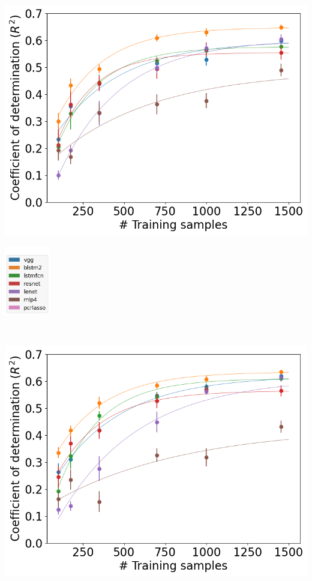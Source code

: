 \documentclass[a0paper,landscape,fontscale=0.365]{baposter}
\newenvironment{Figure}
  {\par\medskip\noindent\minipage{\linewidth}}
  {\endminipage\par\medskip}
\begin{document}
\begin{poster}
{\begin{multicols}{4}
    \begin{Figure}
        \centering
        \includegraphics[width=1.0\linewidth]{figures/curves_aug_20}
    \end{Figure}
    \columnbreak

    \begin{Figure}
        \includegraphics[height=3cm]{figures/legend}
    \end{Figure}

\end{multicols}
\\
\begin{multicols}{4}
    \begin{Figure}
        \centering
        \includegraphics[width=1.0\linewidth]{figures/curves_aug_10}
    \end{Figure}
    \columnbreak


\end{multicols}}
\end{poster}
\end{document}
